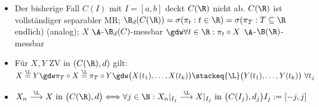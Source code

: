 \begin{itemize}
		\item Der bisherige Fall $C(I)$ mit $I=[a,b]$ deckt $C(\R)$ nicht ab.
	$C(\R)$ ist vollständiger separabler MR; $\B_d(C(\R))=\sigma(\pi_t:t\in\R)=\sigma(\pi_T:T\subseteq\R$ endlich) (analog);
	$X$ $\A$-$\B_d(C)$-messbar $\gdw\forall t\in\R:\pi_t\circ X$ $\A$-$\B(\R)$-messbar
		\item Für $X,Y$ ZV in $(C(\R),d)$ gilt: $X\overset{\L}{=}Y\gdw\pi_T\circ X\overset{\L}{=}\pi_T\circ Y\gdw\big(X(t_1),\ldots,X(t_k)\big)\stackeq{\L}\big(Y(t_1),\ldots,Y(t_k)\big)~\forall t_j$
		\item $X_n\stackrel{\L}{\longrightarrow}X\text{ in }\big(C(\R),d\big)
		\Longleftrightarrow\forall j\in\N:
		X_n|_{I_j}\stackrel{\L}{\longrightarrow} X|_{I_j}\text{ in }\big(C(I_j),d_j\big)\mit I_j:=[-j,j]$
	\end{itemize}

